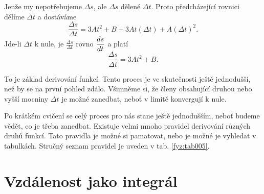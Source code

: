 {    Jenže my nepotřebujeme \(\Delta s\), ale \(\Delta s\) dělené \(\Delta t\). Proto předcházející 
    rovnici dělíme \(\Delta t\) a dostáváme
    \begin{equation}\label{FYZ:eq121}
       \frac{\Delta s}{\Delta t} = 3At^2 + B + 3At(\Delta t) + A(\Delta t)^2.
    \end{equation}
    Jde-li \(\Delta t\) k nule, je \(\frac{\Delta s}{\Delta t}\) rovno \(\dfrac{d s}{d t}\) a platí
    \begin{equation}\label{FYZ:eq122}
       \frac{\Delta s}{\Delta t} = 3At^2 + B.
    \end{equation}
    
    To je základ derivování funkcí. Tento proces je ve skutečnosti ještě jednodušší, než by se na 
    první pohled zdálo. Všimněme si, že členy obsahující druhou nebo vyšší mocniny \(\Delta t\) je 
    možné zanedbat, neboť v limitě konvergují k nule.
    
    Po krátkém cvičení se celý proces pro nás stane ještě jednodušším, neboť budeme vědět, co je 
    třeba zanedbat. Existuje velmi mnoho pravidel derivování různých druhů funkcí. Tato pravidla je 
    možné si pamatovat, nebo je možné je vyhledat v tabulkách. Stručný seznam pravidel je uveden v 
    tab. \ref{fyz:tab005}.
  
  \newpage
  \section{Vzdálenost jako integrál}

}
